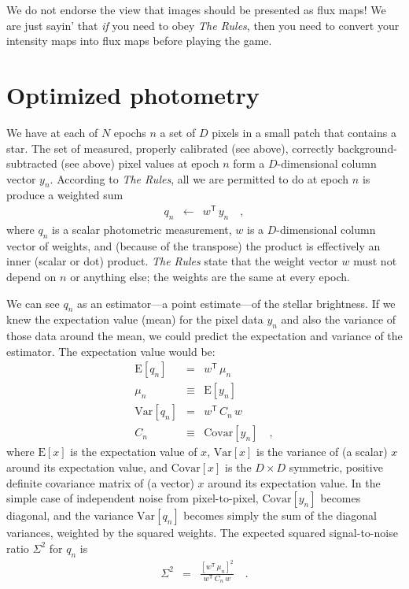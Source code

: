 \documentclass[12pt, letterpaper, preprint]{aastex}
\newcommand{\transpose}[1]{{#1}^{\!\mathsf T}}
\newcommand{\E}[1]{\mathrm{E}[{#1}]}
\newcommand{\Var}[1]{\mathrm{Var}[{#1}]}
\newcommand{\Covar}[1]{\mathrm{Covar}[{#1}]}
\begin{document}
We do not endorse the view that images should be presented as flux maps!
We are just sayin' that \emph{if} you need to obey \emph{The Rules},
  then you need to convert your intensity maps into flux maps before playing the game.

\section{Optimized photometry}

We have at each of $N$ epochs $n$ a set of $D$ pixels in a small patch
  that contains a star.
The set of measured, properly calibrated (see above),
  correctly background-subtracted (see above)
  pixel values at epoch $n$ form a $D$-dimensional column vector $y_n$.
According to \emph{The Rules}, all we are permitted to do at epoch $n$
  is produce a weighted sum
\begin{eqnarray}
q_n &\leftarrow& \transpose{w}\, y_n
\quad ,
\end{eqnarray}
  where $q_n$ is a scalar photometric measurement,
  $w$ is a $D$-dimensional column vector of weights,
  and (because of the transpose)
  the product is effectively an inner (scalar or dot) product.
\emph{The Rules} state that the weight vector $w$ must not depend on $n$ or anything else;
  the weights are the same at every epoch.

We can see $q_n$ as an estimator---a point estimate---of the stellar brightness.
If we knew the expectation value (mean) for the pixel data $y_n$ and also the
  variance of those data around the mean,
  we could predict the expectation and variance of the estimator.
The expectation value would be:
\begin{eqnarray}
\E{q_n} &=& \transpose{w}\, \mu_n
\\
\mu_n &\equiv& \E{y_n}
\\
\Var{q_n} &=& \transpose{w}\, C_n\, w
\\
C_n &\equiv& \Covar{y_n}
\quad ,
\end{eqnarray}
  where $\E{x}$ is the expectation value of $x$,
  $\Var{x}$ is the variance of (a scalar) $x$ around its expectation value,
  and $\Covar{x}$ is the $D\times D$ symmetric, positive definite covariance matrix
  of (a vector) $x$ around its expectation value.
In the simple case of independent noise from pixel-to-pixel,
  $\Covar{y_n}$ becomes diagonal,
  and the variance $\Var{q_n}$ becomes simply the sum of the diagonal variances,
  weighted by the squared weights.
The expected squared signal-to-noise ratio $\Sigma^2$ for $q_n$ is
\begin{eqnarray}
\Sigma^2 &=& \frac{[\transpose{w}\, \mu_n]^2}{\transpose{w}\, C_n\, w}
\quad .
\end{eqnarray}
\end{document}
